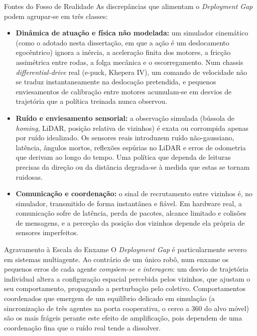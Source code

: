 \documentclass[12pt,reqno, twoside]{amsbook}
\makeatletter
\def\subsection{\@startsection{subsection}{2}%
      \z@{.5\linespacing\@plus.7\linespacing}{.25\linespacing}%
      {\normalfont\bfseries\flushleft}}
\theoremstyle{plain}
\numberwithin{equation}{chapter}
\numberwithin{section}{chapter}
\numberwithin{table}{chapter}
\numberwithin{figure}{chapter}
\makeatother
\begin{document}
\subsection{Fontes do Fosso de Realidade}
As discrepâncias que alimentam o \textit{Deployment Gap} podem agrupar-se em três classes:
\begin{itemize}
    \item \textbf{Dinâmica de atuação e física não modelada:} um simulador cinemático (como o adotado nesta dissertação, em que a ação é um deslocamento egocêntrico) ignora a inércia, a aceleração finita dos motores, a fricção assimétrica entre rodas, a folga mecânica e o escorregamento. Num chassis \textit{differential-drive} real (e-puck, Khepera IV), um comando de velocidade não se traduz instantaneamente na deslocação pretendida, e pequenos enviesamentos de calibração entre motores acumulam-se em desvios de trajetória que a política treinada nunca observou.
    \item \textbf{Ruído e enviesamento sensorial:} a observação simulada (bússola de \textit{homing}, LiDAR, posição relativa de vizinhos) é exata ou corrompida apenas por ruído idealizado. Os sensores reais introduzem ruído não-gaussiano, latência, ângulos mortos, reflexões espúrias no LiDAR e erros de odometria que derivam ao longo do tempo. Uma política que dependa de leituras precisas da direção ou da distância degrada-se à medida que estas se tornam ruidosas.
    \item \textbf{Comunicação e coordenação:} o sinal de recrutamento entre vizinhos é, no simulador, transmitido de forma instantânea e fiável. Em hardware real, a comunicação sofre de latência, perda de pacotes, alcance limitado e colisões de mensagens, e a perceção da posição dos vizinhos depende ela própria de sensores imperfeitos.
\end{itemize}

\subsection{Agravamento à Escala do Enxame}
O \textit{Deployment Gap} é particularmente severo em sistemas multiagente. Ao contrário de um único robô, num enxame os pequenos erros de cada agente \emph{compõem-se e interagem}: um desvio de trajetória individual altera a configuração espacial percebida pelos vizinhos, que ajustam o seu comportamento, propagando a perturbação pelo coletivo. Comportamentos coordenados que emergem de um equilíbrio delicado em simulação (a sincronização de três agentes na porta cooperativa, o cerco a 360\textdegree{} do alvo móvel) são os mais frágeis perante este efeito de amplificação, pois dependem de uma coordenação fina que o ruído real tende a dissolver.
\end{document}
